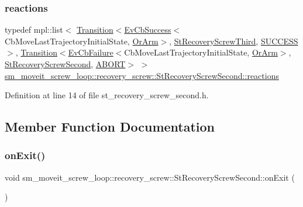 \subsubsection{\texorpdfstring{reactions}{reactions}}
{\footnotesize\ttfamily typedef mpl\+::list$<$ \hyperlink{classsmacc_1_1Transition}{Transition}$<$\hyperlink{structsmacc_1_1EvCbSuccess}{Ev\+Cb\+Success}$<$Cb\+Move\+Last\+Trajectory\+Initial\+State, \hyperlink{classsm__moveit__screw__loop_1_1OrArm}{Or\+Arm}$>$, \hyperlink{structsm__moveit__screw__loop_1_1recovery__screw_1_1StRecoveryScrewThird}{St\+Recovery\+Screw\+Third}, \hyperlink{structsmacc_1_1default__transition__tags_1_1SUCCESS}{S\+U\+C\+C\+E\+SS}$>$, \hyperlink{classsmacc_1_1Transition}{Transition}$<$\hyperlink{structsmacc_1_1EvCbFailure}{Ev\+Cb\+Failure}$<$Cb\+Move\+Last\+Trajectory\+Initial\+State, \hyperlink{classsm__moveit__screw__loop_1_1OrArm}{Or\+Arm}$>$, \hyperlink{structsm__moveit__screw__loop_1_1recovery__screw_1_1StRecoveryScrewSecond}{St\+Recovery\+Screw\+Second}, \hyperlink{structsmacc_1_1default__transition__tags_1_1ABORT}{A\+B\+O\+RT}$>$ $>$ \hyperlink{structsm__moveit__screw__loop_1_1recovery__screw_1_1StRecoveryScrewSecond_a72df84fab4a1f85baa6bd8eeebaece14}{sm\+\_\+moveit\+\_\+screw\+\_\+loop\+::recovery\+\_\+screw\+::\+St\+Recovery\+Screw\+Second\+::reactions}}



Definition at line 14 of file st\+\_\+recovery\+\_\+screw\+\_\+second.\+h.



\subsection{Member Function Documentation}
\mbox{\label{structsm__moveit__screw__loop_1_1recovery__screw_1_1StRecoveryScrewSecond_ad4e4990fe1b55e6a153eeee26b51488d}} 
\subsubsection{\texorpdfstring{on\+Exit()}{onExit()}}
{\footnotesize\ttfamily void sm\+\_\+moveit\+\_\+screw\+\_\+loop\+::recovery\+\_\+screw\+::\+St\+Recovery\+Screw\+Second\+::on\+Exit (\begin{DoxyParamCaption}{ }\end{DoxyParamCaption})\hspace{0.3cm}{\ttfamily [inline]}}



